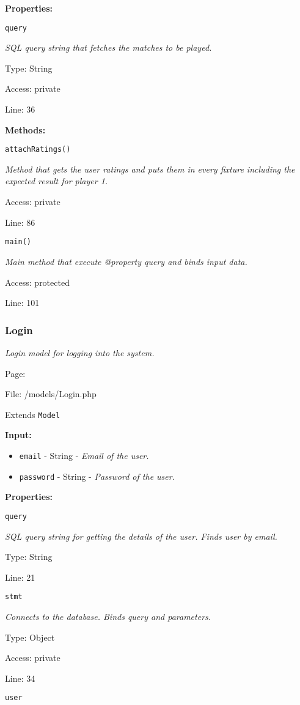 \textbf{Properties:}

\texttt{query}

{\scriptsize
\textit{SQL query string that fetches the matches to be played.}

Type: String

Access: private

Line: 36

}
\textbf{Methods:}

\texttt{attachRatings()}

{\scriptsize
\textit{Method that gets the user ratings and puts them in every fixture including the expected result for player 1.}

Access: private

Line: 86

}

\texttt{main()}

{\scriptsize
\textit{Main method that execute @property query and binds input data.}

Access: protected

Line: 101

}

\subsubsection{Login}\label{Login.php.doc}
\textit{Login model for logging into the system.}

Page: \pageref{Login.php}

File: /models/Login.php

Extends \texttt{Model}

\textbf{Input:}
\begin{itemize}
\item \texttt{email} - String - \textit{Email of the user.}
\item \texttt{password} - String - \textit{Password of the user.}
\end{itemize}

\textbf{Properties:}

\texttt{query}

{\scriptsize
\textit{SQL query string for getting the details of the user.
Finds user by email.}

Type: String

Line: 21

}
\texttt{stmt}

{\scriptsize
\textit{Connects to the database.
Binds query and parameters.}

Type: Object

Access: private

Line: 34

}
\texttt{user}

